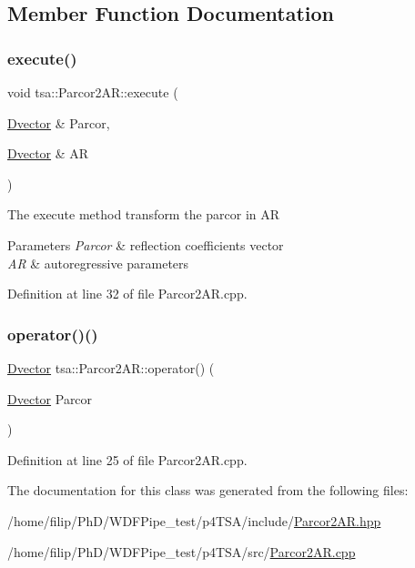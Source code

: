 \subsection{Member Function Documentation}
\mbox{\label{classtsa_1_1_parcor2_a_r_a0a761baa7118ecfe61e612c1ae27a360}} 
\subsubsection{\texorpdfstring{execute()}{execute()}}
{\footnotesize\ttfamily void tsa\+::\+Parcor2\+A\+R\+::execute (\begin{DoxyParamCaption}\item[{\hyperlink{namespacetsa_a8900fb03d849baf447a1a0efe2561fb2}{Dvector} \&}]{Parcor,  }\item[{\hyperlink{namespacetsa_a8900fb03d849baf447a1a0efe2561fb2}{Dvector} \&}]{AR }\end{DoxyParamCaption})}

The execute method transform the parcor in AR


\begin{DoxyParams}{Parameters}
{\em Parcor} & reflection coefficients vector \\
\hline
{\em AR} & autoregressive parameters \\
\hline
\end{DoxyParams}


Definition at line 32 of file Parcor2\+A\+R.\+cpp.

\mbox{\label{classtsa_1_1_parcor2_a_r_aa87caf6b20cdb03a33fddf7e8c9beeef}} 
\subsubsection{\texorpdfstring{operator()()}{operator()()}}
{\footnotesize\ttfamily \hyperlink{namespacetsa_a8900fb03d849baf447a1a0efe2561fb2}{Dvector} tsa\+::\+Parcor2\+A\+R\+::operator() (\begin{DoxyParamCaption}\item[{\hyperlink{namespacetsa_a8900fb03d849baf447a1a0efe2561fb2}{Dvector}}]{Parcor }\end{DoxyParamCaption})}



Definition at line 25 of file Parcor2\+A\+R.\+cpp.



The documentation for this class was generated from the following files\+:\begin{DoxyCompactItemize}
\item 
/home/filip/\+Ph\+D/\+W\+D\+F\+Pipe\+\_\+test/p4\+T\+S\+A/include/\hyperlink{_parcor2_a_r_8hpp}{Parcor2\+A\+R.\+hpp}\item 
/home/filip/\+Ph\+D/\+W\+D\+F\+Pipe\+\_\+test/p4\+T\+S\+A/src/\hyperlink{_parcor2_a_r_8cpp}{Parcor2\+A\+R.\+cpp}\end{DoxyCompactItemize}
